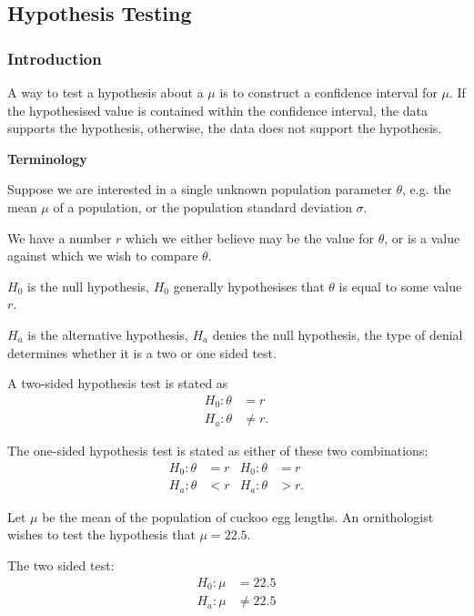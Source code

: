\documentclass[10pt, a4paper]{article}
\begin{document}
\subsection{Hypothesis Testing}

\subsubsection{Introduction}
A way to test a hypothesis about a $\mu$ is to construct a confidence interval for $\mu$.
If the hypothesised value is contained within the confidence interval,
the data supports the hypothesis,
otherwise,
the data does not support the hypothesis.

\textbf{Terminology}

Suppose we are interested in a single unknown population parameter $\theta$,
e.g. the mean $\mu$ of a population,
or the population standard deviation $\sigma$.

We have a number $r$ which we either believe may be the value for $\theta$,
or is a value against which we wish to compare $\theta$.

\begin{definition}
    $H_0$ is the null hypothesis,
    $H_0$ generally hypothesises that $\theta$ is equal to some value $r$.

    $H_a$ is the alternative hypothesis,
    $H_a$ denies the null hypothesis,
    the type of denial determines whether it is a two or one sided test.

    A two-sided hypothesis test is stated as
    \begin{align*}
        H_0 : \theta &= r \\
        H_a : \theta &\neq r.
    \end{align*}

    The one-sided hypothesis test is stated as either of these two combinations:
    \begin{align*}
        H_0 : \theta &= r & H_0 : \theta &= r \\
        H_a : \theta &< r & H_a : \theta &> r.
    \end{align*}
\end{definition}

\begin{example}
    Let $\mu$ be the mean of the population of cuckoo egg lengths.
    An ornithologist wishes to test the hypothesis that $\mu = 22.5$.

    \begin{solution}
        The two sided test:
        \begin{align*}
            H_0 : \mu &= 22.5 \\
            H_a : \mu &\neq 22.5
        \end{align*}
    \end{solution}
\end{example}
\end{document}
